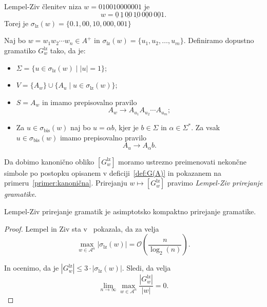 \documentclass[fin1, tisk]{fmfdelo}
\providecommand{\abs}[1]{\left\lvert #1 \right\rvert}
\newcommand{\A}{\mathcal{A}}
\theoremstyle{definition}
\begin{document}
\begin{primer}\label{primer:LZČlenitev}
    Lempel-Ziv členitev niza $w = 010010000001$ je
    \[
    w = \underline{0} \, \underline{1} \, \underline{00} \, \underline{10} \, \underline{000}
    \, \underline{001}.
    \]
    Torej je $\sigma_{\text{lz}}(w) = \{ 0. 1, 00, 10, 000, 001 \}$
\end{primer}

\begin{definicija}
    Naj bo $w = w_1w_2 \cdots w_n \in A^+$ in $\sigma_\text{lz}(w) = \{ u_1, u_2, \ldots, u_m \}$.
    Definiramo dopustno gramatiko $G^\text{lz}_w$ tako, da je:
    \begin{itemize}
        \item $\Sigma = \{ u \in \sigma_{\text{lz}}(w) \mid \abs{u} = 1 \}$;
        \item $V = \{ A_w \} \cup \{ A_u \mid u \in \sigma_{\text{lz}}(w) \}$;
        \item $S = A_w$ in imamo prepisovalno pravilo 
        \[ 
            A_w \rightarrow A_{u_1}A_{u_2} \cdots A_{u_m};
        \]
        \item Za $u \in \sigma_{\text{bis}}(w)$ naj bo $u = \alpha b$, kjer je $b \in \Sigma$ in 
        $\alpha \in \Sigma^*$. Za vsak $u \in \sigma_{\text{bis}}(w)$ imamo prepisovalno pravilo
        \[
            A_u \rightarrow A_{\alpha}b.
        \]
    \end{itemize}
    Da dobimo kanonično obliko $[G^\text{lz}_w]$ moramo ustrezno preimenovati nekončne simbole po
    postopku opisanem v deficiji~\ref{def:G(A)} in pokazanem na primeru~\ref{primer:kanonična}.
    Prirejanju $w \mapsto [G^\text{lz}_w]$ pravimo \emph{Lempel-Ziv prirejanje gramatike}.
\end{definicija}

\begin{trditev}
    Lempel-Ziv prirejanje gramatik je asimptotsko kompaktno prirejanje gramatike.
\end{trditev}

\begin{proof}
    Lempel in Ziv sta v~\cite{LempelZiv1976} pokazala, da za velja
    \[
        \max_{w \in \A^n} \abs{\sigma_\text{lz}(w)} = \mathcal{O} \left( \frac{n}{\log_2(n)} \right).
    \]

    In  ocenimo, da je $\abs{G^\text{lz}_w} \leq 3 \cdot \abs{\sigma_\text{lz}(w)}$. Sledi, da
    velja
    \[
        \lim_{n \rightarrow \infty} \max_{w \in \A^n} \frac{\abs{G^\text{lz}_w}}{\abs{w}} = 0.
    \]
\end{proof}
\end{document}
